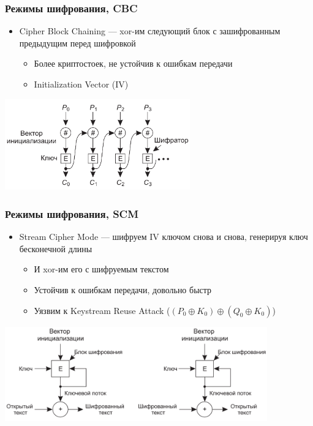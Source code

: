 \documentclass{../cscslides}
\begin{document}
    \begin{frame}
        \frametitle{Режимы шифрования, CBC}
        \begin{itemize}
            \item Cipher Block Chaining --- xor-им следующий блок с зашифрованным предыдущим перед шифровкой
            \begin{itemize}
                \item Более криптостоек, не устойчив к ошибкам передачи
                \item Initialization Vector (IV)
            \end{itemize}
        \end{itemize}
        \begin{center}
            \includegraphics[width=0.6\textwidth]{cbc.png}
        \end{center}
    \end{frame}

    \begin{frame}
        \frametitle{Режимы шифрования, SCM}
        \begin{itemize}
            \item Stream Cipher Mode --- шифруем IV ключом снова и снова, генерируя ключ бесконечной длины
            \begin{itemize}
                \item И xor-им его с шифруемым текстом
                \item Устойчив к ошибкам передачи, довольно быстр
                \item Уязвим к Keystream Reuse Attack ($(P_0 \oplus K_0) \oplus (Q_0 \oplus K_0)$)
            \end{itemize}
        \end{itemize}
        \begin{center}
            \includegraphics[width=0.85\textwidth]{scm.png}
        \end{center}
    \end{frame}
\end{document}
